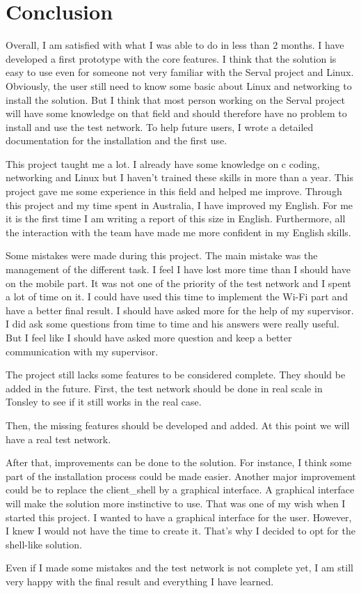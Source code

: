 \chapter{Conclusion}

Overall, I am satisfied with what I was able to do in less than 2 months. I have developed a first prototype with the core features.
I think that the solution is easy to use even for someone not very familiar with the Serval project and Linux. Obviously, the user still need to know some basic about Linux and networking to install the solution. But I think that most person working on the Serval project will have some knowledge on that field and should therefore have no problem to install and use the test network. To help future users, I wrote a detailed documentation for the installation and the first use.

This project taught me a lot. I already have some knowledge on c coding, networking and Linux but I haven't trained these skills in more than a year. This project gave me some experience in this field and helped me improve. Through this project and my time spent in Australia, I have improved my English. For me it is the first time I am writing a report of this size in English. Furthermore, all the interaction with the team have made me more confident in my English skills.
 
Some mistakes were made during this project. The main mistake was the management of the different task. I feel I have lost more time than I should have on the mobile part. It was not one of the priority of the test network and I spent a lot of time on it. I could have used this time to implement the Wi-Fi part and have a better final result. I should have asked more for the help of my supervisor. I did ask some questions from time to time and his answers were really useful. But I feel like I should have asked more question and keep a better communication with my supervisor.

The project still lacks some features to be considered complete. They should be added in the future.
First, the test network should be done in real scale in Tonsley to see if it still works in the real case.

Then, the missing features should be developed and added. 
At this point we will have a real test network.

After that, improvements can be done to the solution. For instance, I think some part of the installation process could be made easier.
Another major improvement could be to replace the client\_shell by a graphical interface. A graphical interface will make the solution more instinctive to use. That was one of my wish when I started this project. I wanted to have a graphical interface for the user. However, I knew I would not have the time to create it. That's why I decided to opt for the shell-like solution.

Even if I made some mistakes and the test network is not complete yet, I am still very happy with the final result and everything I have learned.
